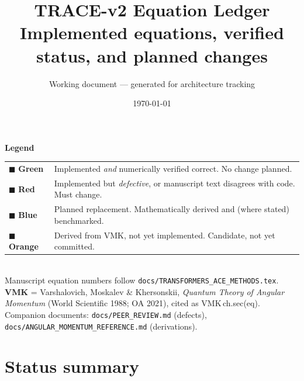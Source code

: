 \documentclass[10pt,a4paper]{article}
\title{\vspace{-1.2cm}\textbf{TRACE-v2 Equation Ledger}\\[2pt]
\large Implemented equations, verified status, and planned changes}
\author{Working document --- generated for architecture tracking}
\date{\today}
\newcommand{\OK}[1]{\textcolor{OKgreen}{#1}}
\newcommand{\BAD}[1]{\textcolor{BADred}{#1}}
\newcommand{\NEW}[1]{\textcolor{NEWblue}{#1}}
\newcommand{\DER}[1]{\textcolor{DERIVorange}{#1}}
\newcommand{\code}[1]{\texttt{\small #1}}
\begin{document}
\maketitle
\vspace{-0.6cm}

\begin{tcolorbox}[colback=white,colframe=black!55,boxrule=0.6pt,left=6pt,right=6pt]
\textbf{\normalsize Legend}\\[3pt]
\begin{tabular}{@{}ll@{}}
\OK{$\blacksquare$ \textbf{Green}}  & Implemented \emph{and} numerically verified correct. No change planned.\\
\BAD{$\blacksquare$ \textbf{Red}}   & Implemented but \emph{defective}, or manuscript text disagrees with code. Must change.\\
\NEW{$\blacksquare$ \textbf{Blue}}  & Planned replacement. Mathematically derived and (where stated) benchmarked.\\
\DER{$\blacksquare$ \textbf{Orange}}& Derived from VMK, not yet implemented. Candidate, not yet committed.\\
\end{tabular}\\[4pt]
\footnotesize
Manuscript equation numbers follow \code{docs/TRANSFORMERS\_ACE\_METHODS.tex}.
\textbf{VMK} = Varshalovich, Moskalev \& Khersonskii, \emph{Quantum Theory of Angular
Momentum} (World Scientific 1988; OA 2021), cited as VMK\,ch.sec(eq).
Companion documents: \code{docs/PEER\_REVIEW.md} (defects),
\code{docs/ANGULAR\_MOMENTUM\_REFERENCE.md} (derivations).
\end{tcolorbox}

\section{Status summary}
\end{document}
